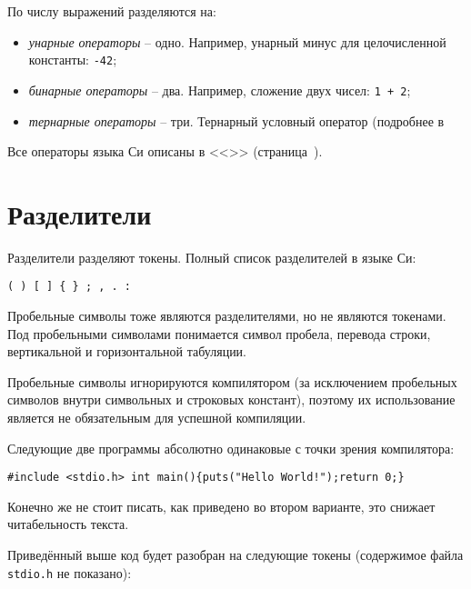 \documentclass[myc.tex]{subfiles}
\begin{document}
По числу выражений разделяются на:
\begin{itemize}
\item \textit{унарные операторы} -- одно. Например, унарный минус для целочисленной константы: \texttt{-42};
\item \textit{бинарные операторы} -- два. Например, сложение двух чисел: \texttt{1 + 2};
\item \textit{тернарные операторы} -- три. Тернарный условный оператор (подробнее в %
\end{itemize}

Все операторы языка Си описаны в <<>> (страница~\pageref{ch:operators}). %








\section{Разделители}

Разделители разделяют токены. Полный список разделителей в языке Си:

\texttt{( ) [ ] \{ \} ; , . :}

Пробельные символы тоже являются разделителями, но не являются токенами. Под пробельными символами понимается символ пробела, перевода строки, вертикальной и горизонтальной табуляции.

Пробельные символы игнорируются компилятором (за исключением пробельных символов внутри символьных и строковых констант), поэтому их использование является не обязательным для успешной компиляции.

Следующие две программы абсолютно одинаковые с точки зрения компилятора:



\begin{lstlisting}
#include <stdio.h> int main(){puts("Hello World!");return 0;}
\end{lstlisting}

Конечно же не стоит писать, как приведено во втором варианте, это снижает читабельность текста.

Приведённый выше код будет разобран на следующие токены (содержимое файла \texttt{stdio.h} не показано):
\end{document}
